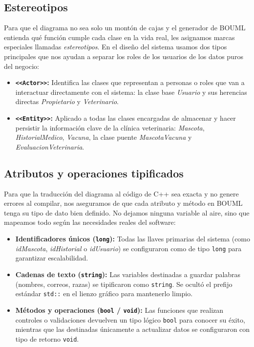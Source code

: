 \documentclass[journal,onecolumn]{IEEEtran}
\begin{document}
	\subsection{Estereotipos}
	Para que el diagrama no sea solo un montón de cajas y el generador de BOUML entienda qué función cumple cada clase en la vida real, les asignamos marcas especiales llamadas \textit{estereotipos}. En el diseño del sistema usamos dos tipos principales que nos ayudan a separar los roles de los usuarios de los datos puros del negocio:
	\begin{itemize}
		\item \textbf{\texttt{<<Actor>>}:} Identifica las clases que representan a personas o roles que van a interactuar directamente con el sistema: la clase base \textit{Usuario} y sus herencias directas \textit{Propietario} y \textit{Veterinario}.
		\item \textbf{\texttt{<<Entity>>}:} Aplicado a todas las clases encargadas de almacenar y hacer persistir la información clave de la clínica veterinaria: \textit{Mascota}, \textit{HistorialMedico}, \textit{Vacuna}, la clase puente \textit{MascotaVacuna} y \textit{EvaluacionVeterinaria}.
	\end{itemize}
	
	\subsection{Atributos y operaciones tipificados}
	Para que la traducción del diagrama al código de C++ sea exacta y no genere errores al compilar, nos aseguramos de que cada atributo y método en BOUML tenga su tipo de dato bien definido. No dejamos ninguna variable al aire, sino que mapeamos todo según las necesidades reales del software:
	\begin{itemize}
		\item \textbf{Identificadores únicos (\texttt{long}):} Todas las llaves primarias del sistema (como \textit{idMascota}, \textit{idHistorial} o \textit{idUsuario}) se configuraron como de tipo \texttt{long} para garantizar escalabilidad.
		\item \textbf{Cadenas de texto (\texttt{string}):} Las variables destinadas a guardar palabras (nombres, correos, razas) se tipificaron como \texttt{string}. Se ocultó el prefijo estándar \texttt{std::} en el lienzo gráfico para mantenerlo limpio.
		\item \textbf{Métodos y operaciones (\texttt{bool} / \texttt{void}):} Las funciones que realizan controles o validaciones devuelven un tipo lógico \texttt{bool} para conocer su éxito, mientras que las destinadas únicamente a actualizar datos se configuraron con tipo de retorno \texttt{void}.
	\end{itemize}
	
\end{document}
